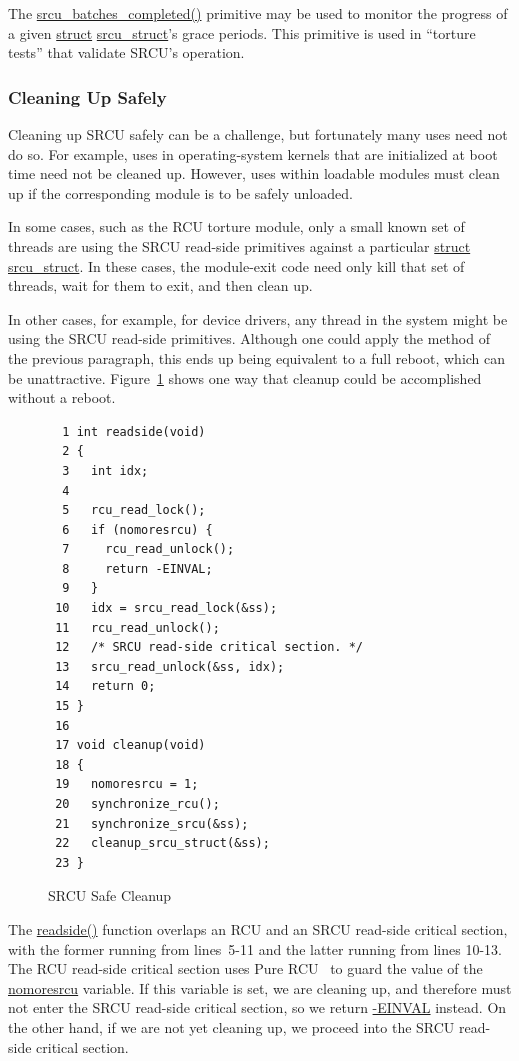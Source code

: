 The \url{srcu_batches_completed()} primitive may be used to
monitor the progress of a given \url{struct} \url{srcu_struct}'s
grace periods.
This primitive is used in ``torture tests'' that validate SRCU's operation.

\subsubsection{Cleaning Up Safely}
\label{sec:app:rcuimpl:Cleaning Up Safely}

Cleaning up SRCU safely can be a challenge, but fortunately many
uses need not do so.
For example, uses in operating-system kernels that are initialized at
boot time need not be cleaned up.
However, uses within loadable modules must clean up if the corresponding
module is to be safely unloaded.

In some cases, such as the RCU torture module,
only a small known set of threads are using the
SRCU read-side primitives against a particular \url{struct} \url{srcu_struct}.
In these cases, the module-exit code need only kill that set of threads,
wait for them to exit, and then clean up.

In other cases, for example, for device drivers, any thread in the
system might be using the SRCU read-side primitives.
Although one could apply the method of the previous paragraph, this
ends up being equivalent to a full reboot, which can be unattractive.
Figure~\ref{fig:app:rcuimpl:SRCU Safe Cleanup} shows one way that cleanup
could be accomplished without a reboot.

\begin{figure}[htbp]
{ \scriptsize
\begin{verbatim}
  1 int readside(void)
  2 {
  3   int idx;
  4
  5   rcu_read_lock();
  6   if (nomoresrcu) {
  7     rcu_read_unlock();
  8     return -EINVAL;
  9   }
 10   idx = srcu_read_lock(&ss);
 11   rcu_read_unlock();
 12   /* SRCU read-side critical section. */
 13   srcu_read_unlock(&ss, idx);
 14   return 0;
 15 }
 16
 17 void cleanup(void)
 18 {
 19   nomoresrcu = 1;
 20   synchronize_rcu();
 21   synchronize_srcu(&ss);
 22   cleanup_srcu_struct(&ss);
 23 }
\end{verbatim}
}
\caption{SRCU Safe Cleanup}
\label{fig:app:rcuimpl:SRCU Safe Cleanup}
\end{figure}

The \url{readside()} function overlaps an RCU and an SRCU read-side
critical section, with the former running from lines~5-11 and the
latter running from lines 10-13.
The RCU read-side critical section uses Pure
RCU~\cite{PaulEdwardMcKenneyPhD}
to guard the
value of the \url{nomoresrcu} variable.
If this variable is set, we are cleaning up, and therefore must not enter
the SRCU read-side critical section, so we return \url{-EINVAL} instead.
On the other hand, if we are not yet cleaning up, we proceed into the
SRCU read-side critical section.

